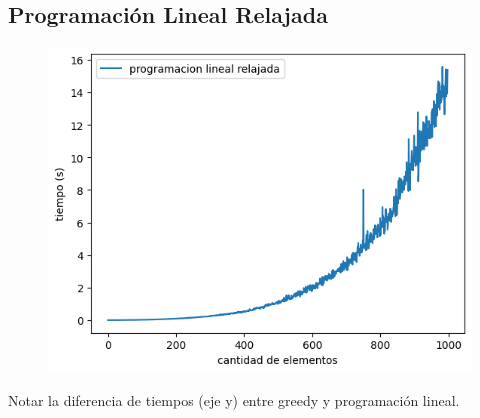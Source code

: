 \subsection{Programación Lineal Relajada}

\begin{figure}[H]
    \centering
    \includegraphics[width=1\textwidth]{img/pl_rlx.png}
\end{figure}

Notar la diferencia de tiempos (eje y) entre greedy y programación lineal.
